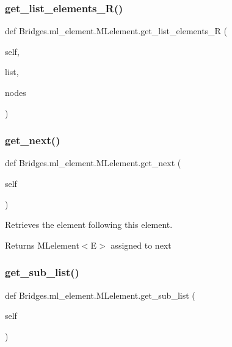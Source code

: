 \subsubsection{\texorpdfstring{get\+\_\+list\+\_\+elements\+\_\+\+R()}{get\_list\_elements\_R()}}
{\footnotesize\ttfamily def Bridges.\+ml\+\_\+element.\+M\+Lelement.\+get\+\_\+list\+\_\+elements\+\_\+R (\begin{DoxyParamCaption}\item[{}]{self,  }\item[{}]{list,  }\item[{}]{nodes }\end{DoxyParamCaption})}

\mbox{\label{class_bridges_1_1ml__element_1_1_m_lelement_ab4035d339d6133c3b2aab19028aafdf2}} 
\subsubsection{\texorpdfstring{get\+\_\+next()}{get\_next()}}
{\footnotesize\ttfamily def Bridges.\+ml\+\_\+element.\+M\+Lelement.\+get\+\_\+next (\begin{DoxyParamCaption}\item[{}]{self }\end{DoxyParamCaption})}



Retrieves the element following this element. 

\begin{DoxyReturn}{Returns}
M\+Lelement$<$\+E$>$ assigned to next 
\end{DoxyReturn}
\mbox{\label{class_bridges_1_1ml__element_1_1_m_lelement_ab60b9e960312e5210793bff87a6b81c8}} 
\subsubsection{\texorpdfstring{get\+\_\+sub\+\_\+list()}{get\_sub\_list()}}
{\footnotesize\ttfamily def Bridges.\+ml\+\_\+element.\+M\+Lelement.\+get\+\_\+sub\+\_\+list (\begin{DoxyParamCaption}\item[{}]{self }\end{DoxyParamCaption})}



